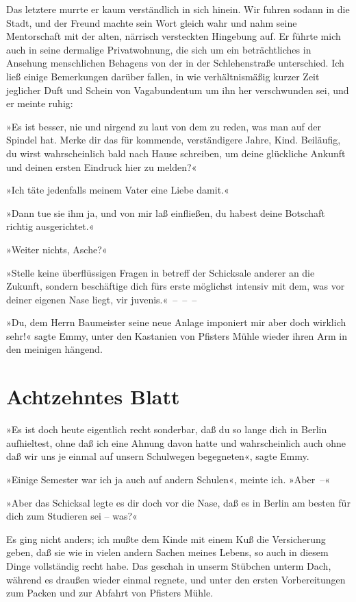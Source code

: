 Das letztere murrte er kaum verständlich in sich hinein. Wir fuhren
sodann in die Stadt, und der Freund machte sein Wort gleich wahr
und nahm seine Mentorschaft mit der alten, närrisch versteckten
Hingebung auf. Er führte mich auch in seine dermalige
Privatwohnung, die sich um ein beträchtliches in Ansehung
menschlichen Behagens von der in der Schlehenstraße unterschied.
Ich ließ einige Bemerkungen darüber fallen, in wie verhältnismäßig
kurzer Zeit jeglicher Duft und Schein von Vagabundentum um ihn her
verschwunden sei, und er meinte ruhig:

»Es ist besser, nie und nirgend zu laut von dem zu reden, was man
auf der Spindel hat. Merke dir das für kommende, verständigere
Jahre, Kind. Beiläufig, du wirst wahrscheinlich bald nach Hause
schreiben, um deine glückliche Ankunft und deinen ersten Eindruck
hier zu melden?«

»Ich täte jedenfalls meinem Vater eine Liebe damit.«

»Dann tue sie ihm ja, und von mir laß einfließen, du habest deine
Botschaft richtig ausgerichtet.«

»Weiter nichts, Asche?«

»Stelle keine überflüssigen Fragen in betreff der Schicksale
anderer an die Zukunft, sondern beschäftige dich fürs erste
möglichst intensiv mit dem, was vor deiner eigenen Nase liegt, vir
juvenis.«~–~–~–

»Du, dem Herrn Baumeister seine neue Anlage imponiert mir aber doch
wirklich sehr!« sagte Emmy, unter den Kastanien von Pfisters Mühle
wieder ihren Arm in den meinigen hängend.

\section{Achtzehntes Blatt}

»Es ist doch heute eigentlich recht sonderbar, daß du so lange dich
in Berlin aufhieltest, ohne daß ich eine Ahnung davon hatte und
wahrscheinlich auch ohne daß wir uns je einmal auf unsern
Schulwegen begegneten«, sagte Emmy.

»Einige Semester war ich ja auch auf andern Schulen«, meinte ich.
»Aber~–«

»Aber das Schicksal legte es dir doch vor die Nase, daß es in
Berlin am besten für dich zum Studieren sei – was?«

Es ging nicht anders; ich mußte dem Kinde mit einem Kuß die
Versicherung geben, daß sie wie in vielen andern Sachen meines
Lebens, so auch in diesem Dinge vollständig recht habe. Das geschah
in unserm Stübchen unterm Dach, während es draußen wieder einmal
regnete, und unter den ersten Vorbereitungen zum Packen und zur
Abfahrt von Pfisters Mühle.

